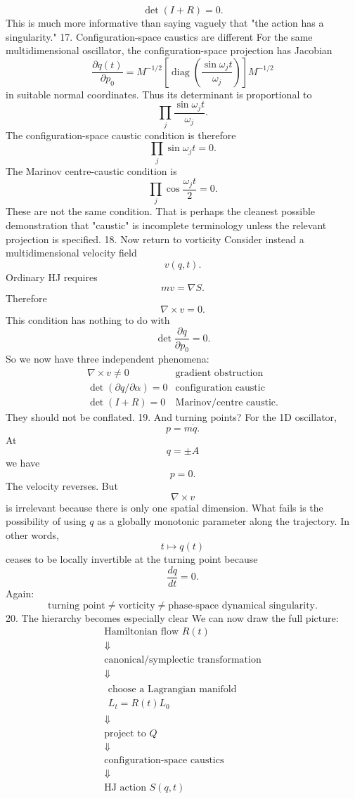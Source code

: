 $$ \boxed{ \det(I+R)=0. } $$
This is much more informative than saying vaguely that "the action has a singularity."
17. Configuration-space caustics are different
For the same multidimensional oscillator, the configuration-space projection has Jacobian
$$ \frac{\partial q(t)}{\partial p_0} = M^{-1/2} \left[ \operatorname{diag} \left( \frac{\sin\omega_jt}{\omega_j} \right) \right] M^{-1/2} $$
in suitable normal coordinates.
Thus its determinant is proportional to
$$ \prod_j\frac{\sin\omega_jt}{\omega_j}. $$
The configuration-space caustic condition is therefore
$$ \boxed{ \prod_j\sin\omega_jt=0. } $$
The Marinov centre-caustic condition is
$$ \boxed{ \prod_j\cos\frac{\omega_jt}{2}=0. } $$
These are not the same condition.
That is perhaps the cleanest possible demonstration that "caustic" is incomplete terminology unless the relevant projection is specified.
18. Now return to vorticity
Consider instead a multidimensional velocity field
$$ v(q,t). $$
Ordinary HJ requires
$$ mv=\nabla S. $$
Therefore
$$ \nabla\times v=0. $$
This condition has nothing to do with
$$ \det\frac{\partial q}{\partial p_0}=0. $$
So we now have three independent phenomena:
$$ \boxed{ \begin{array}{cc} 
\nabla\times v\neq0 & \text{gradient obstruction} \\[2mm] 
\det(\partial q/\partial\alpha)=0 & \text{configuration caustic} \\[2mm]
\det(I+R)=0 & \text{Marinov/centre caustic}. 
\end{array}} $$
They should not be conflated.
19. And turning points?
For the 1D oscillator,
$$ p=m\dot q. $$
At
$$ q=\pm A $$
we have
$$ p=0. $$
The velocity reverses.
But
$$ \nabla\times v $$
is irrelevant because there is only one spatial dimension.
What fails is the possibility of using \(q\) as a globally monotonic parameter along the trajectory.
In other words,
$$ t\mapsto q(t) $$
ceases to be locally invertible at the turning point because
$$ \frac{dq}{dt}=0. $$
Again:
$$ \boxed{ \text{turning point} \neq \text{vorticity} \neq \text{phase-space dynamical singularity}. } $$
20. The hierarchy becomes especially clear
We can now draw the full picture:
$$ \boxed{ \begin{array}{c} \text{Hamiltonian flow }R(t) \\ \Downarrow \\ \text{canonical/symplectic transformation} \\ \Downarrow \\ \begin{array}{c} \text{choose a Lagrangian manifold}\\ L_t=R(t)L_0 \end{array} \\ \Downarrow \\ \text{project to }Q \\ \Downarrow \\ \text{configuration-space caustics} \\ \Downarrow \\ \text{HJ action }S(q,t) \end{array}} $$
